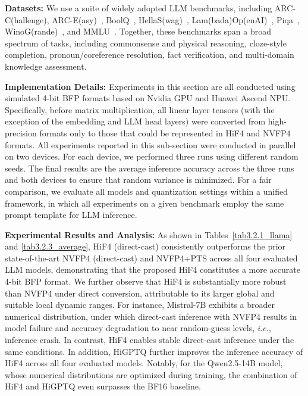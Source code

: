 


\noindent\textbf{Datasets:} 
We use a suite of widely adopted LLM benchmarks, 
including ARC-C(hallenge), ARC-E(asy)~\cite{Clark2018}, 
BoolQ~\cite{Clark2019}, HellaS(wag)~\cite{Zellers2019}, 
Lam(bada)Op(enAI)~\cite{Paperno2016}, 
Piqa~\cite{Bisk2020}, WinoG(rande)~\cite{Sakaguchi2019}, 
and MMLU~\cite{Hendrycks2021}. 
Together, these benchmarks span a broad spectrum of tasks, 
including commonsense and physical reasoning, 
cloze-style completion, pronoun/coreference resolution, 
fact verification, 
and multi-domain knowledge assessment. 

\noindent\textbf{Implementation Details:} 
Experiments in this section are all conducted using simulated 4-bit BFP 
formats based on Nvidia GPU and Huawei Ascend NPU. 
Specifically, before matrix multiplication, all linear layer tensors 
(with the exception of the embedding and LLM head layers) were converted 
from high-precision formats only to those that could be represented in 
HiF4 and NVFP4 formats. 
All experiments reported in this sub-section were conducted in parallel 
on two devices. 
For each device, we performed three runs using different random seeds. 
The final results are the average inference accuracy across the three runs 
and both devices to ensure that random variance is minimized. 
For a fair comparison, we evaluate all models and quantization settings 
within a unified framework, in which all experiments on a given benchmark 
employ the same prompt template for LLM inference. 

\noindent\textbf{Experimental Results and Analysis:} 
As shown in Tables~\ref{tab3.2.1_llama} and \ref{tab3.2.3_average}, 
HiF4 (direct-cast) consistently outperforms the prior state-of-the-art 
NVFP4 (direct-cast) and NVFP4+PTS across all four evaluated LLM models,  
demonstrating that the proposed HiF4 constitutes a more accurate 4-bit 
BFP format. 
We further observe that HiF4 is substantially more robust than NVFP4 
under direct conversion, 
attributable to its larger global and suitable local dynamic ranges. 
For instance, Mistral-7B exhibits a broader numerical distribution, 
under which direct-cast inference with NVFP4 results in model failure 
and accuracy degradation to near random-guess levels, 
\textit{i.e.}, inference crash. 
In contrast, HiF4 enables stable direct-cast inference under the same 
conditions. 
In addition, HiGPTQ further improves the inference 
accuracy of HiF4 across all four evaluated models. 
Notably, for the Qwen2.5-14B model, whose numerical distributions 
are optimized during training, 
the combination of HiF4 and HiGPTQ even surpasses the BF16 baseline. 

